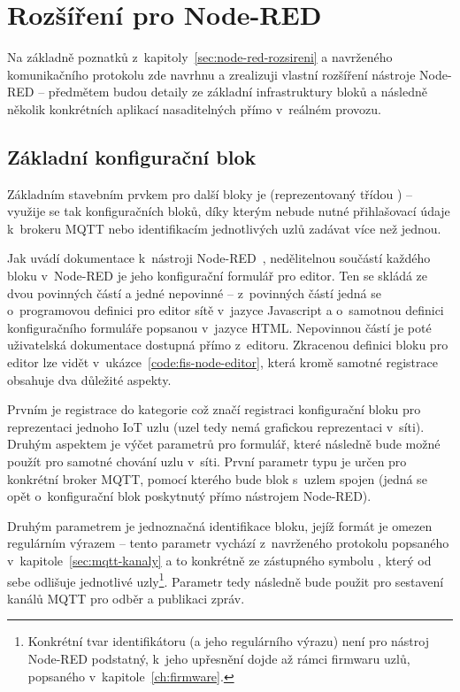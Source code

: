 \chapter{Rozšíření pro Node-RED}
\label{ch:rozsireni}

Na základně poznatků z~kapitoly~\ref{sec:node-red-rozsireni} a navrženého komunikačního protokolu zde navrhnu a
zrealizuji vlastní rozšíření nástroje Node-RED -- předmětem budou detaily ze základní infrastruktury bloků a
následně několik konkrétních
aplikací nasaditelných přímo v~reálném provozu.

\section{Základní konfigurační blok}\label{sec:zakladni-konfiguracni-blok}
Základním stavebním prvkem pro další bloky je  (reprezentovaný třídou \mbox{)} -- využije se
tak
konfiguračních bloků, díky kterým nebude nutné přihlašovací údaje k~brokeru MQTT nebo identifikacím jednotlivých
uzlů zadávat více než jednou.

Jak uvádí dokumentace k~nástroji Node-RED~\cite{NodeRedDocs}, nedělitelnou součástí každého bloku v~Node-RED je jeho
konfigurační formulář pro editor.
Ten se skládá ze dvou povinných částí a jedné nepovinné -- z~povinných částí jedná se o~programovou definici pro editor
sítě v~jazyce Javascript a o~samotnou definici konfiguračního formuláře popsanou v~jazyce HTML.
Nepovinnou částí je poté uživatelská dokumentace dostupná přímo z~editoru.
Zkracenou definici bloku pro editor lze vidět v~ukázce~\ref{code:fis-node-editor}, která kromě samotné registrace
obsahuje dva důležité aspekty.

Prvním je registrace do kategorie  což značí registraci konfigurační bloku pro reprezentaci jednoho IoT
uzlu (uzel tedy nemá grafickou reprezentaci v~síti).
Druhým aspektem je výčet parametrů pro formulář, které následně bude možné použít pro samotné chování uzlu v~síti.
První parametr typu  je určen pro konkrétní broker MQTT, pomocí kterého bude blok s~uzlem spojen
(jedná se opět o~konfigurační blok poskytnutý přímo nástrojem Node-RED).

Druhým parametrem je jednoznačná identifikace bloku, jejíž formát je omezen regulárním výrazem -- tento
parametr vychází z~navrženého protokolu popsaného v~kapitole~\ref{sec:mqtt-kanaly} a to
konkrétně ze zástupného symbolu , který od sebe odlišuje jednotlivé uzly\footnote{Konkrétní tvar
identifikátoru (a jeho regulárního výrazu) není pro nástroj Node-RED podstatný, k~jeho upřesnění dojde až rámci
firmwaru uzlů, popsaného v~kapitole~\ref{ch:firmware}.}.
Parametr  tedy následně bude použit pro sestavení kanálů MQTT pro odběr a publikaci zpráv.

